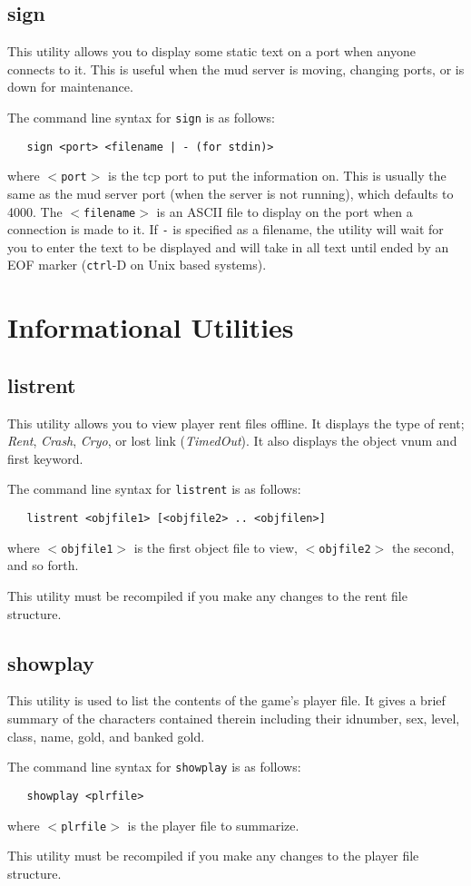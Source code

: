 \documentclass[11pt]{article}
\begin{document}
\subsection{sign}
This utility allows you to display some static text on a port when anyone connects to it.  This is useful when the mud server is moving, changing ports, or is down for maintenance.
\par
The command line syntax for \texttt{sign} is as follows:
\begin{verbatim}
   sign <port> <filename | - (for stdin)>
\end{verbatim}
where \texttt{$<$port$>$} is the tcp port to put the information on.  This is usually the same as the mud server port (when the server is not running), which defaults to 4000.  The \texttt{$<$filename$>$} is an ASCII file to display on the port when a connection is made to it.  If \texttt{-} is specified as a filename, the utility will wait for you to enter the text to be displayed and will take in all text until ended by an EOF marker (\texttt{ctrl}-D on Unix based systems).

\section{Informational Utilities}
\subsection{listrent}
This utility allows you to view player rent files offline.  It displays the type of rent; {\em Rent}, {\em Crash}, {\em Cryo}, or lost link ({\em TimedOut}).  It also displays the object vnum and first keyword.
\par
The command line syntax for \texttt{listrent} is as follows:
\begin{verbatim}
   listrent <objfile1> [<objfile2> .. <objfilen>]
\end{verbatim}
where \texttt{$<$objfile1$>$} is the first object file to view, \texttt{$<$objfile2$>$} the second, and so forth.
\par
This utility must be recompiled if you make any changes to the rent file structure.


\subsection{showplay}
This utility is used to list the contents of the game's player file.  It gives a brief summary of the characters contained therein including their idnumber, sex, level, class, name, gold, and banked gold.
\par
The command line syntax for \texttt{showplay} is as follows:
\begin{verbatim}
   showplay <plrfile>
\end{verbatim}
where \texttt{$<$plrfile$>$} is the player file to summarize.
\par
This utility must be recompiled if you make any changes to the player file structure.
\end{document}
